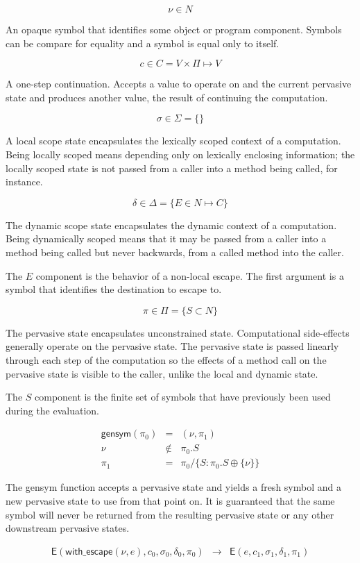 \documentclass{article}
\begin{document}
\newcommand{\eval}{\mathsf{E}}
\newcommand{\op}[1]{\mathsf{#1}}
\newcommand{\cnt}{c}
\newcommand{\scst}{\sigma}
\newcommand{\dyst}{\delta}
\newcommand{\pest}{\pi}
\newcommand{\sym}{\nu}
\newcommand{\prop}[1]{\mathsf{#1}}
\newcommand{\fun}[1]{\mathsf{#1}}

\[ \sym \in N \]

An opaque symbol that identifies some object or program component. Symbols can
be compare for equality and a symbol is equal only to itself.

\[ \cnt \in C = V \times \Pi \mapsto V \]

A one-step continuation. Accepts a value to operate on and the current pervasive
state and produces another value, the result of continuing the computation.

\[ \scst \in \Sigma = \{ \} \]

A local scope state encapsulates the lexically scoped context of a computation.
Being locally scoped means depending only on lexically enclosing information;
the locally scoped state is not passed from a caller into a method being called,
for instance.

\[ \dyst \in \Delta = \{ E \in N \mapsto C \} \]

The dynamic scope state encapsulates the dynamic context of a computation. Being
dynamically scoped means that it may be passed from a caller into a method being
called but never backwards, from a called method into the caller.

The $E$ component is the behavior of a non-local escape. The first argument is
a symbol that identifies the destination to escape to.

\[ \pest \in \Pi = \{ S \subset N \} \]

The pervasive state encapsulates unconstrained state. Computational side-effects
generally operate on the pervasive state. The pervasive state is passed linearly
through each step of the computation so the effects of a method call on the
pervasive state is visible to the caller, unlike the local and dynamic state.

The $S$ component is the finite set of symbols that have previously been used
during the evaluation.

\begin{eqnarray}
\fun{gensym}(\pest_0) & = & (\sym, \pest_1) \\
\sym & \notin & \pest_0.S \\
\pest_1 & = & \pest_0 / \{ S: \pest_0.S \oplus \{ \sym \} \}
\end{eqnarray}

The gensym function accepts a pervasive state and yields a fresh symbol and a
new pervasive state to use from that point on. It is guaranteed that the same
symbol will never be returned from the resulting pervasive state or any
other downstream pervasive states.

\begin{eqnarray}
\eval(\op{with\_escape}(\sym, e), \cnt_0, \scst_0, \dyst_0, \pest_0) & \to & 
\eval(e, \cnt_1, \scst_1, \dyst_1, \pest_1)
\end{eqnarray}
\end{document}
